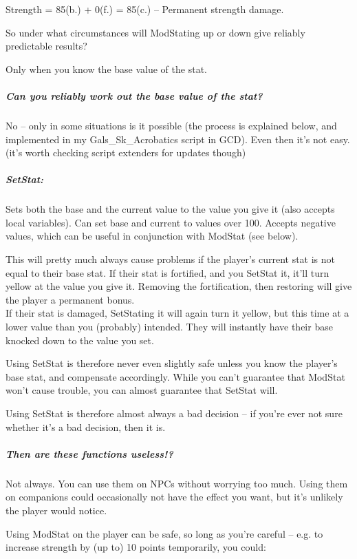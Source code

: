 Strength = 85(b.) + 0(f.) = 85(c.) -- Permanent strength damage.

So under what circumstances will ModStating up or down give reliably
predictable results?

Only when you know the base value of the stat.

\hypertarget{can-you-reliably-work-out-the-base-value-of-the-stat}{%
\subparagraph{Can you reliably work out the base value of the
stat?}\label{can-you-reliably-work-out-the-base-value-of-the-stat}}

No -- only in some situations is it possible (the process is explained
below, and implemented in my Gals\_Sk\_Acrobatics script in GCD). Even
then it's not easy. (it's worth checking script extenders for updates
though)

\hypertarget{setstat}{%
\subparagraph{SetStat:}\label{setstat}}

Sets both the base and the current value to the value you give it (also
accepts local variables). Can set base and current to values over 100.
Accepts negative values, which can be useful in conjunction with ModStat
(see below).

This will pretty much always cause problems if the player's current stat
is not equal to their base stat. If their stat is fortified, and you
SetStat it, it'll turn yellow at the value you give it. Removing the
fortification, then restoring will give the player a permanent bonus.\\
If their stat is damaged, SetStating it will again turn it yellow, but
this time at a lower value than you (probably) intended. They will
instantly have their base knocked down to the value you set.

Using SetStat is therefore never even slightly safe unless you know the
player's base stat, and compensate accordingly. While you can't
guarantee that ModStat won't cause trouble, you can almost guarantee
that SetStat will.

Using SetStat is therefore almost always a bad decision -- if you're
ever not sure whether it's a bad decision, then it is.

\hypertarget{then-are-these-functions-useless}{%
\subparagraph{Then are these functions
useless!?}\label{then-are-these-functions-useless}}

Not always. You can use them on NPCs without worrying too much. Using
them on companions could occasionally not have the effect you want, but
it's unlikely the player would notice.

Using ModStat on the player can be safe, so long as you're careful --
e.g. to increase strength by (up to) 10 points temporarily, you could:

